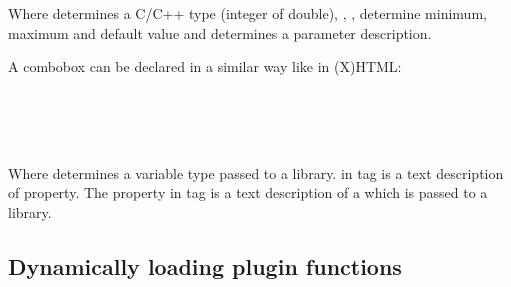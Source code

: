 Where  determines a C/C++ type (integer of double), , ,  determine minimum, maximum and default value and  determines a parameter description.

A combobox can be declared in a similar way like in (X)HTML:

\noindent \indent {}\\
\indent \indent {}\\
\indent \indent {}\\
\indent {}

Where  determines a variable type passed to a library.  in  tag is a text description of property. The  property in  tag is a text description of a  which is passed to a library.


\begin{comment}
First idea was to use our own way to describe plugin GUI. The first version of plugins system used it's own primitive language. Lines in description file were corresponding to GUI elements. First word of a line determined a type of an element. Other words on the line described element behaviour such as default value, minimum and maximum value or a corresponding function in a library. This own language of GUI description was sufficient but it was unnecessary to force plugin programmer to use our own language. Instead it would be better to use some existing standard.

Other way how to describe a plugin GUI was to use XML language. XML is often use in computer science to pass information in an easily processable form. Moreover Qt library includes extended tools for XML processing.

Last option is to use Qt language for UI description. Qt library uses it's own form to describe application GUI - description is in a special file with a \clist{.ui} extension. It is a strong argument for this option that it is a native way for Qt library to use this langage. Qt library provides a utility for interactive GUI creating. 
\end{comment}



\subsection*{Dynamically loading plugin functions}

